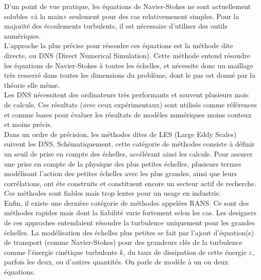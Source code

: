 \documentclass[a4paper,12pt]{article}
\newcommand{\keps}{$k-\varepsilon$}
\newcommand{\NS}{Navier-Stokes}
\numberwithin{equation}{section} %
\begin{document}
\noindent D'un point de vue pratique, les équations de \NS $ $ ne sont actuellement solubles «à la main» seulement pour des cas relativemenent simples. Pour la majorité des écoulements turbulents, il est nécessaire d'utiliser des outils numériques.\\
L'approche la plus précise pour résoudre ces équations est la méthode dite directe, ou DNS (Direct Numerical Simulation). Cette méthode entend résoudre les équations de \NS $ $ à toutes les échelles, et nécessite donc un maillage très resserré dans toutes les dimensions du problème, dont le pas est donné par la théorie elle même. \\
Les DNS nécessitent des ordinateurs très performants et souvent plusieurs mois de calculs. Ces résultats (avec ceux expérimentaux) sont utilisés comme références et comme bases pour évaluer les résultats de modèles numériques moins couteux et moins précis.\\
Dans un ordre de précision, les méthodes dites de LES (Large Eddy Scales) suivent les DNS. Schématiquement, cette catégorie de méthodes consiste à définir un seuil de prise en compte des échelles, accélérant ainsi les calculs. Pour assurer une prise en compte de la physique des plus petites échelles, plusieurs termes modélisant l'action des petites échelles avec les plus grandes, ainsi que leurs corrélations, ont éte construits et constituent encore un secteur actif de recherche. Ces méthodes sont fiables mais trop lentes pour un usage en industrie.\\

\noindent Enfin, il existe une dernière catégorie de méthodes appelées RANS. Ce sont des méthodes rapides mais dont la fiabilité varie fortement selon les cas. Les designers de ces approches entendaient résoudre la turbulence uniquement pour les grandes échelles. La modélisation des échelles plus petites se fait par l'ajout d'équation(s) de transport (comme Navier-Stokes) pour des grandeurs clés de la turbulence comme l'énergie cinétique turbulente $k$, du taux de dissipation de cette énergie $\varepsilon$, parfois les deux, ou d'autres quantités. On parle de modèle à un ou deux équations. \\%
\end{document}
